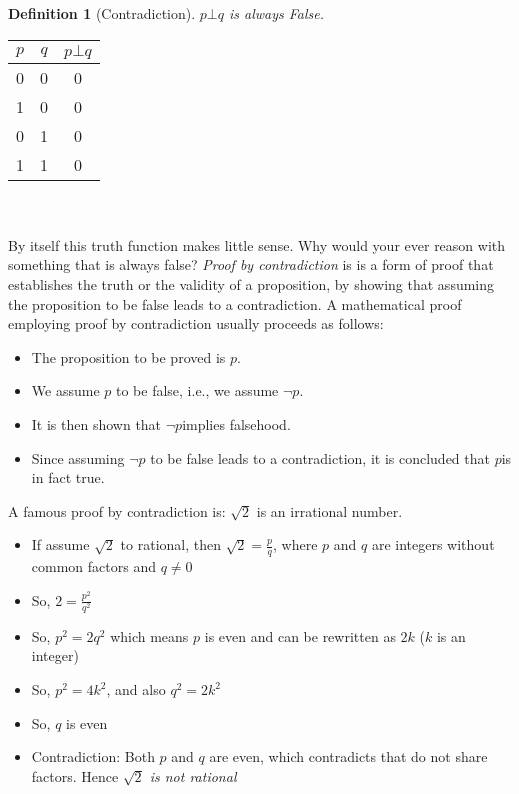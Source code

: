 \documentclass[10pt,a4paper,draft,titlepage,onecolumn]{book}
\newtheorem{definition}{Definition}[section]
\begin{document}
\begin{definition}[Contradiction] $p \bot q $ is always False.
\end{definition}  
\begin{tabular}{ |c|c|c| }
 \hline
 $p$ & $q$ &  $p \bot q $ \\
 \hline
 0 & 0 & 0 \\
 1 & 0 & 0\\
 0 & 1 & 0\\
 1 & 1 & 0\\
 \hline
\end{tabular}\\\\
By itself this truth function makes little sense. Why would your ever reason with something that is always false?
\textit{Proof by contradiction }is  is a form of proof that establishes the truth or the validity of a proposition, by showing that assuming the proposition to be false leads to a contradiction. 
A mathematical proof employing proof by contradiction usually proceeds as follows:
\begin{itemize}
\item The proposition to be proved is $p$.
\item We assume $p$ to be false, i.e., we assume $\neg p$.
\item It is then shown that $\neg p$implies falsehood. 
\item Since assuming $\neg p$ to be false leads to a contradiction, it is concluded that $ p$is in fact true.
\end{itemize}
A famous proof by contradiction is: $\sqrt{2}$ is an irrational number. 
\begin{itemize}
\item If assume $\sqrt{2}$  to rational, then $\sqrt{2} = \frac{p}{q}$, where $p$ and $q$ are integers without common factors and $q \neq 0$
\item So, $ 2 = \frac{p^2}{q^2} $   
\item So, $ p^2 = 2{q^2} $ which means $p$ is even and can be rewritten as $ 2k$ ($k$ is an integer)
\item So,  $ p^2 = 4k^2$, and also $ q^2 = 2k^2$
\item So, $q$ is even
\item Contradiction: Both $p$ and $q$ are even, which contradicts that do not share factors. Hence  \textit{$\sqrt{2}$  is not rational}


\end{itemize}
\end{document}
